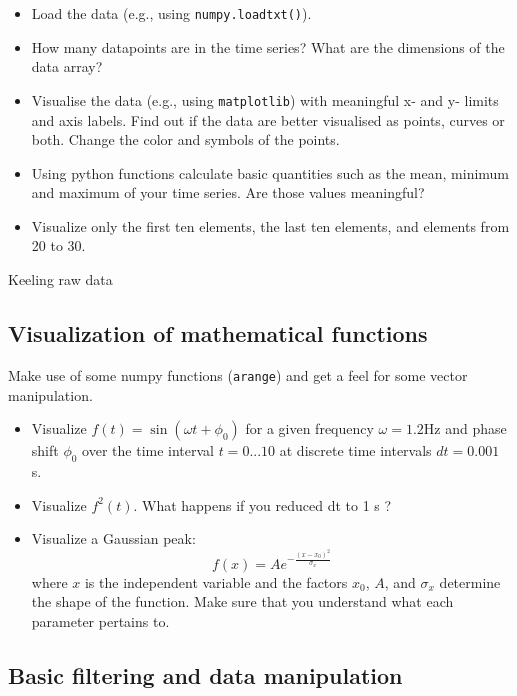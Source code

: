 \begin{itemize}
\item Load the data (e.g., using \verb|numpy.loadtxt()|).
\item How many datapoints are in the time series? What are the dimensions of the data array?
\item Visualise the data (e.g., using \verb|matplotlib|) with  meaningful x- and y- limits and axis labels. Find out if the data are better visualised as points, curves or both. Change the color and symbols of the points.
\item Using python functions calculate basic quantities such as the mean, minimum and maximum of your time series. Are those values meaningful?
\item Visualize only the first ten elements, the last ten elements, and elements from 20 to 30.
\end{itemize}

\ifanswers
\begin{tcolorbox}[enhanced jigsaw,breakable,pad at break*=1mm,
  colback=blue!5!white,colframe=babyblueeyes,title=Solutions,
  watermark color=white]
  Keeling raw data
  
\end{tcolorbox}
\fi


\subsection{Visualization of mathematical functions}
\label{sec:mathfunc}

Make use of some numpy functions (\verb|arange|) and get a feel for some vector manipulation.

\begin{itemize}
  \item Visualize $f(t)=\sin(\omega t + \phi_0)$ for a given frequency $\omega=1.2$Hz and phase shift $\phi_0$ over the time interval $t=0...10$ at discrete time intervals $dt=0.001$ s.
  \item Visualize $f^2(t)$. What happens if you reduced dt to 1 s ?
  \item Visualize a Gaussian peak:
  $$
  f(x) = Ae^{-\frac{(x-x_0)^2}{\sigma_x}}
  $$
  where $x$ is the independent variable and the factors $x_0$, $A$, and $\sigma_x$ determine the shape of the function. Make sure that you understand what each parameter pertains to.
\end{itemize}

\subsection{Basic filtering and data manipulation}
\label{sec:loops}

